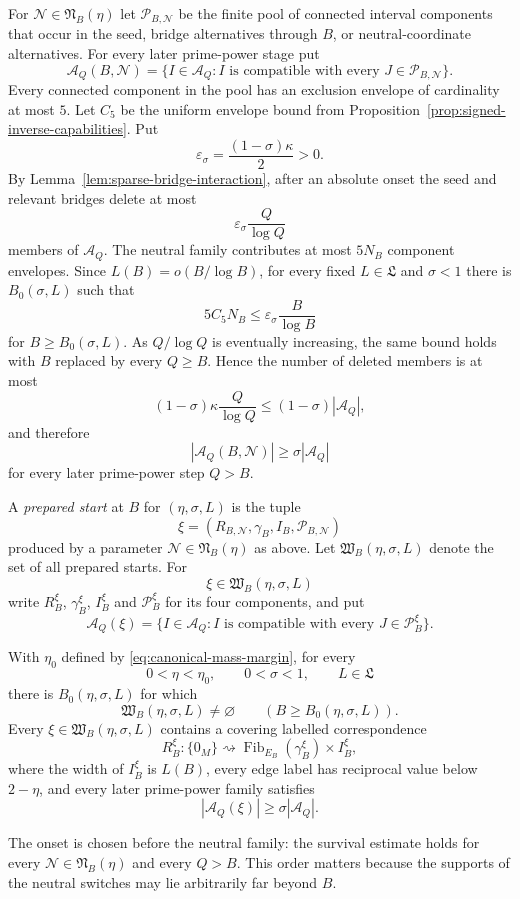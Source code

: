 For $\mathscr N\in\mathfrak N_B(\eta)$ let $\mathscr P_{B,\mathscr N}$ be the finite pool of connected interval components that occur in the seed, bridge alternatives through $B$, or neutral-coordinate alternatives.  For every later prime-power stage put
\begin{equation}\label{eq:compatible-subfamily}
\mathcal A_Q(B,\mathscr N)
=
\{I\in\mathcal A_Q:I\text{ is compatible with every }J\in\mathscr P_{B,\mathscr N}\}.
\end{equation}
Every connected component in the pool has an exclusion envelope of cardinality at most $5$.  Let $C_5$ be the uniform envelope bound from Proposition~\ref{prop:signed-inverse-capabilities}.  Put
\[
\varepsilon_\sigma=\frac{(1-\sigma)\kappa}{2}>0.
\]
By Lemma~\ref{lem:sparse-bridge-interaction}, after an absolute onset the seed and relevant bridges delete at most
\[
\varepsilon_\sigma\frac Q{\log Q}
\]
members of $\mathcal A_Q$.  The neutral family contributes at most $5N_B$ component envelopes.  Since $L(B)=o(B/\log B)$, for every fixed $L\in\mathfrak L$ and $\sigma<1$ there is $B_0(\sigma,L)$ such that
\[
5C_5N_B
\le
\varepsilon_\sigma\frac B{\log B}
\]
for $B\ge B_0(\sigma,L)$.  As $Q/\log Q$ is eventually increasing, the same bound holds with $B$ replaced by every $Q\ge B$.  Hence the number of deleted members is at most
\[
(1-\sigma)\kappa\frac Q{\log Q}
\le
(1-\sigma)|\mathcal A_Q|,
\]
and therefore
\begin{equation}\label{eq:wide-survivor-fraction}
|\mathcal A_Q(B,\mathscr N)|\ge\sigma|\mathcal A_Q|
\end{equation}
for every later prime-power step $Q>B$.

A \emph{prepared start} at $B$ for $(\eta,\sigma,L)$ is the tuple
\[
\xi=(R_{B,\mathscr N},\gamma_B,I_B,\mathscr P_{B,\mathscr N})
\]
produced by a parameter $\mathscr N\in\mathfrak N_B(\eta)$ as above.  Let $\mathfrak W_B(\eta,\sigma,L)$ denote the set of all prepared starts.  For
\[
\xi\in\mathfrak W_B(\eta,\sigma,L)
\]
write $R_B^\xi$, $\gamma_B^\xi$, $I_B^\xi$ and $\mathscr P_B^\xi$ for its four components, and put
\[
\mathcal A_Q(\xi)
=
\{I\in\mathcal A_Q:I\text{ is compatible with every }J\in\mathscr P_B^\xi\}.
\]

\begin{proposition}\label{prop:wide-start}
With $\eta_0$ defined by \eqref{eq:canonical-mass-margin}, for every
\[
0<\eta<\eta_0,
\qquad
0<\sigma<1,
\qquad
L\in\mathfrak L
\]
there is $B_0(\eta,\sigma,L)$ for which
\begin{equation}\label{eq:wide-start-regular-epi}
\mathfrak W_B(\eta,\sigma,L)\ne\varnothing
\qquad(B\ge B_0(\eta,\sigma,L)).
\end{equation}
Every $\xi\in\mathfrak W_B(\eta,\sigma,L)$ contains a covering labelled correspondence
\[
R_B^\xi:\{0_M\}\rightsquigarrow
\operatorname{Fib}_{E_B}(\gamma_B^\xi)\times I_B^\xi,
\]
where the width of $I_B^\xi$ is $L(B)$, every edge label has reciprocal value below $2-\eta$, and every later prime-power family satisfies
\[
|\mathcal A_Q(\xi)|\ge\sigma|\mathcal A_Q|.
\]
\end{proposition}

The onset is chosen before the neutral family: the survival estimate holds for every $\mathscr N\in\mathfrak N_B(\eta)$ and every $Q>B$.  This order matters because the supports of the neutral switches may lie arbitrarily far beyond $B$.
